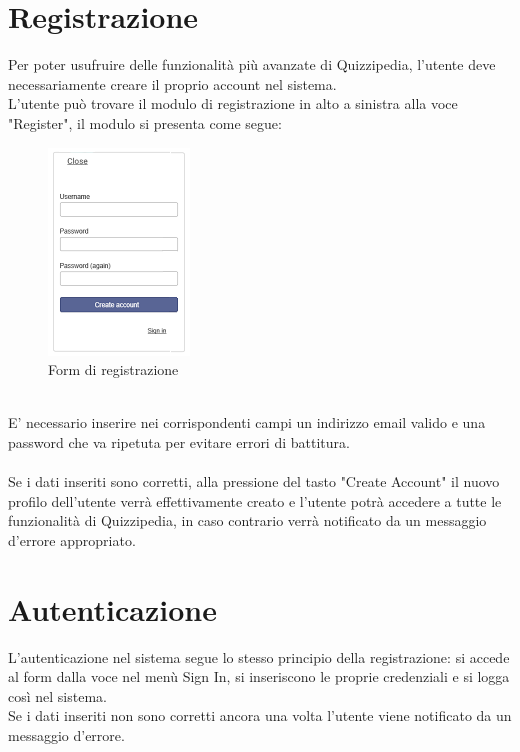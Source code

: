 \documentclass[a4paper,11pt]{article}
\begin{document}
	\section{Registrazione}
	Per poter usufruire delle funzionalità più avanzate di Quizzipedia, l'utente deve necessariamente creare il proprio account nel sistema.\\
	L'utente può trovare il modulo di registrazione in alto a sinistra alla voce "Register", il modulo si presenta come segue:\\
	\begin{figure}[h!]
	\begin{center}
	\includegraphics[scale=0.85]{../images/form.png}
	\caption{Form di registrazione}
	\end{center}
	\end{figure}	
	\\
	E' necessario inserire nei corrispondenti campi un indirizzo email valido e una password che va ripetuta per evitare errori di battitura.\\ \\
	Se i dati inseriti sono corretti, alla pressione del tasto "Create Account" il nuovo profilo dell'utente verrà effettivamente creato e l'utente potrà accedere a tutte le funzionalità di Quizzipedia, in caso contrario verrà notificato da un messaggio d'errore appropriato.
	\section{Autenticazione}
	L'autenticazione nel sistema segue lo stesso principio della registrazione: si accede al form dalla voce nel menù Sign In, si inseriscono le proprie credenziali e si logga così nel sistema.\\ Se i dati inseriti non sono corretti ancora una volta l'utente viene notificato da un messaggio d'errore. 
	\newpage
\end{document}
